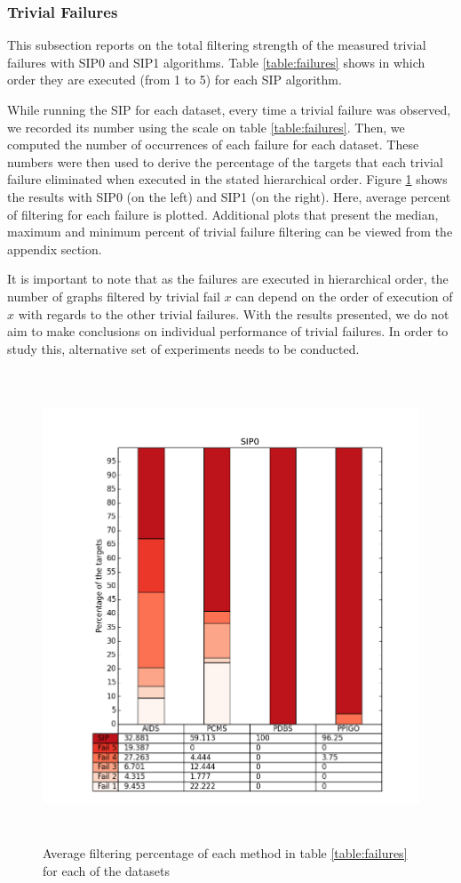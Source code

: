 \documentclass{l4proj}
\begin{document}
\subsubsection{Trivial Failures}
This subsection reports on the total filtering strength of the measured trivial failures with SIP0 and SIP1 algorithms. Table \ref{table:failures} shows in which order they are executed (from 1 to 5) for each SIP algorithm.

While running the SIP for each dataset, every time a trivial failure was observed, we recorded its number using the scale on table \ref{table:failures}. Then, we computed the number of occurrences of each failure for each dataset. These numbers were then used to derive the percentage of the targets that each trivial failure eliminated when executed in the stated hierarchical order. Figure \ref{averageFailures} shows the results with SIP0 (on the left) and SIP1 (on the right). Here, average percent of filtering for each failure is plotted. Additional plots that present the median, maximum and minimum percent of trivial failure filtering can be viewed from the appendix section.

It is important to note that as the failures are executed in hierarchical order, the number of graphs filtered by trivial fail $x$ can depend on the order of execution of $x$ with regards to the other trivial failures. With the results presented, we do not aim to make conclusions on individual performance of trivial failures. In order to study this, alternative set of experiments needs to be conducted.

\begin{figure}[h]
\centering
\includegraphics[height=14cm,width=13cm]{images/plots/sip1avgFails.png}
\caption{Average filtering percentage of each method in table \ref{table:failures} for each of the datasets}
\label{averageFailures}
\end{figure}
\end{document}
